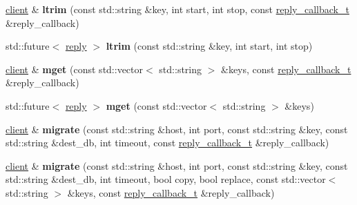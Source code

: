 \begin{DoxyCompactItemize}
\item 
\mbox{\label{classcpp__redis_1_1client_af82304129513a073988583fcfa4210fe}} 
\hyperlink{classcpp__redis_1_1client}{client} \& {\bfseries ltrim} (const std\+::string \&key, int start, int stop, const \hyperlink{classcpp__redis_1_1client_a061a1140d36d2eaeda82b09a0bb3f9f2}{reply\+\_\+callback\+\_\+t} \&reply\+\_\+callback)
\item 
\mbox{\label{classcpp__redis_1_1client_af14f81093a0e6e45d958e9b7a5ed9c16}} 
std\+::future$<$ \hyperlink{classcpp__redis_1_1reply}{reply} $>$ {\bfseries ltrim} (const std\+::string \&key, int start, int stop)
\item 
\mbox{\label{classcpp__redis_1_1client_a946b590d9a2a29ee6ae1971b9208a241}} 
\hyperlink{classcpp__redis_1_1client}{client} \& {\bfseries mget} (const std\+::vector$<$ std\+::string $>$ \&keys, const \hyperlink{classcpp__redis_1_1client_a061a1140d36d2eaeda82b09a0bb3f9f2}{reply\+\_\+callback\+\_\+t} \&reply\+\_\+callback)
\item 
\mbox{\label{classcpp__redis_1_1client_a8c08062c8414fd72d1a0b3ef4f44d89d}} 
std\+::future$<$ \hyperlink{classcpp__redis_1_1reply}{reply} $>$ {\bfseries mget} (const std\+::vector$<$ std\+::string $>$ \&keys)
\item 
\mbox{\label{classcpp__redis_1_1client_acfbf3cb40c0cd532e42d725bbda9a03a}} 
\hyperlink{classcpp__redis_1_1client}{client} \& {\bfseries migrate} (const std\+::string \&host, int port, const std\+::string \&key, const std\+::string \&dest\+\_\+db, int timeout, const \hyperlink{classcpp__redis_1_1client_a061a1140d36d2eaeda82b09a0bb3f9f2}{reply\+\_\+callback\+\_\+t} \&reply\+\_\+callback)
\item 
\mbox{\label{classcpp__redis_1_1client_a671442669b8fe540bfc7d02c05a74207}} 
\hyperlink{classcpp__redis_1_1client}{client} \& {\bfseries migrate} (const std\+::string \&host, int port, const std\+::string \&key, const std\+::string \&dest\+\_\+db, int timeout, bool copy, bool replace, const std\+::vector$<$ std\+::string $>$ \&keys, const \hyperlink{classcpp__redis_1_1client_a061a1140d36d2eaeda82b09a0bb3f9f2}{reply\+\_\+callback\+\_\+t} \&reply\+\_\+callback)

\end{DoxyCompactItemize}
